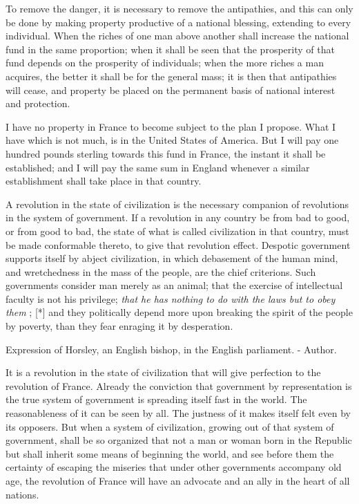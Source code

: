 To remove the danger, it is necessary to remove the antipathies, and this can only be done by making property productive of a national blessing, extending to every individual. When the riches of one man above another shall increase the national fund in the same proportion; when it shall be seen that the prosperity of that fund depends on the prosperity of individuals; when the more riches a man acquires, the better it shall be for the general mass; it is then that antipathies will cease, and property be placed on the permanent basis of national interest and protection.\par

I have no property in France to become subject to the plan I propose. What I have which is not much, is in the United States of America. But I will pay one hundred pounds sterling towards this fund in France, the instant it shall be established; and I will pay the same sum in England whenever a similar establishment shall take place in that country.\par

A revolution in the state of civilization is the necessary companion of revolutions in the system of government. If a revolution in any country be from bad to good, or from good to bad, the state of what is called civilization in that country, must be made conformable thereto, to give that revolution effect. Despotic government supports itself by abject civilization, in which debasement of the human mind, and wretchedness in the mass of the people, are the chief criterions. Such governments consider man merely as an animal; that the exercise of intellectual faculty is not his privilege; \textit{that he has nothing to do with the laws but to obey them }; [*] and they politically depend more upon breaking the spirit of the people by poverty, than they fear enraging it by desperation.\par

\begin{readnote}
[*] Expression of Horsley, an English bishop, in the English parliament. - Author.
\end{readnote}

It is a revolution in the state of civilization that will give perfection to the revolution of France. Already the conviction that government by representation is the true system of government is spreading itself fast in the world. The reasonableness of it can be seen by all. The justness of it makes itself felt even by its opposers. But when a system of civilization, growing out of that system of government, shall be so organized that not a man or woman born in the Republic but shall inherit some means of beginning the world, and see before them the certainty of escaping the miseries that under other governments accompany old age, the revolution of France will have an advocate and an ally in the heart of all nations.\par

